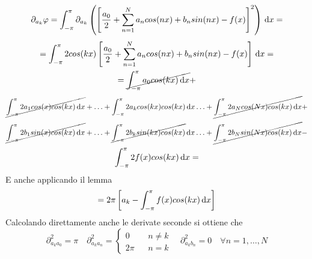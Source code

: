 $$\partial_{a_k}\varphi = \int_{-\pi}^{\pi}\partial_{a_k}\left(\left[\frac{a_0}{2}+\sum\limits_{n=1}^{N}a_{n}cos(nx)+b_{n}sin(nx)-f(x)\right]^2\right)\,\mathrm{d}{x}=$$
$$ = \int_{-\pi}^{\pi} 2cos(kx) \left[\frac{a_0}{2}+\sum\limits_{n=1}^{N}a_{n}cos(nx)+b_{n}sin(nx)-f(x)\right]\,\mathrm{d}{x}=$$
$$ =  \cancel{\int_{-\pi}^{\pi} a_0cos(kx)\,\mathrm{d}{x}} + $$
$$\cancel{\int_{-\pi}^{\pi} 2a_1cos(x)cos(kx)\,\mathrm{d}{x}} +
\ldots + 
\int_{-\pi}^{\pi} 2a_kcos(kx)cos(kx)\,\mathrm{d}{x}
\ldots + 
\cancel{\int_{-\pi}^{\pi} 2a_Ncos(Nx)cos(kx)\,\mathrm{d}{x}} + $$
$$\cancel{\int_{-\pi}^{\pi} 2b_1sin(x)cos(kx)\,\mathrm{d}{x}} +
\ldots + 
\cancel{\int_{-\pi}^{\pi} 2b_ksin(kx)cos(kx)}\,\mathrm{d}{x}
\ldots + 
\cancel{\int_{-\pi}^{\pi} 2b_Nsin(Nx)cos(kx)\,\mathrm{d}{x}} - $$
$$\int_{-\pi}^{\pi} 2f(x)cos(kx)\,\mathrm{d}{x} = $$
E anche applicando il lemma
$$=2\pi\left[a_k-\int_{-\pi}^{\pi}f(x)cos(kx)\,\mathrm{d}{x}\right]$$
Calcolando direttamente anche le derivate seconde si ottiene che
$$\partial^2_{a_ka_0}=\pi\quad\partial^2_{a_ka_n}=
\left\{\begin{matrix}
0&&n\ne k\\2\pi&&n=k
\end{matrix}\right.
\quad\partial^2_{a_kb_n}=0\quad\forall n=1,\ldots,N$$

